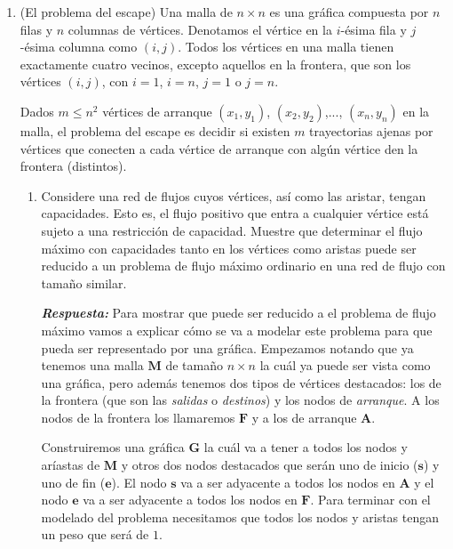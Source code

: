 \documentclass[11pt,letterpaper]{article}
\newcommand\respuesta{\textbf{\textit{Respuesta: }}}
\begin{document}
  \begin{enumerate}[leftmargin=*]
    \item (El problema del escape) Una malla de $n \times n$ es una gráfica compuesta por $n$ filas y $n$ columnas de vértices. Denotamos el vértice en la $i$-ésima fila y $j$-ésima columna como $(i,j)$. 
    Todos los vértices en una malla tienen exactamente cuatro vecinos, excepto aquellos en la frontera, que son los vértices $(i,j)$, con $i=1$, $i=n$, $j=1$ o $j=n$.
    
    Dados $m \leq n^2$ vértices de arranque $(x_1,y_1)$, $(x_2,y_2)$,..., $(x_n,y_n)$ en la malla, el problema del escape es decidir si existen $m$ trayectorias ajenas por vértices que conecten a cada vértice de arranque con algún vértice den la frontera (distintos).

    \begin{enumerate}[label=\alph*)]
      \item Considere una red de flujos cuyos vértices, así como las aristar, tengan capacidades.
      Esto es, el flujo positivo que entra a cualquier vértice está sujeto a una restricción de capacidad.
      Muestre que determinar el flujo máximo con capacidades tanto en los vértices como aristas puede ser reducido a un problema de flujo máximo ordinario en una red de flujo con tamaño similar.
    
      \respuesta Para mostrar que puede ser reducido a el problema de flujo máximo vamos a explicar cómo se va a modelar este problema para que pueda ser representado por una gráfica.
      Empezamos notando que ya tenemos una malla $\mathbf{M}$ de tamaño $n \times n$ la cuál ya puede ser vista como una gráfica, pero además tenemos dos tipos de vértices destacados: los de la frontera (que son las \textit{salidas} o \textit{destinos}) y los nodos de \textit{arranque}.
      A los nodos de la frontera los llamaremos $\mathbf{F}$ y a los de arranque $\mathbf{A}$.

      Construiremos una gráfica $\mathbf{G}$ la cuál va a tener a todos los nodos y aríastas de $\mathbf{M}$ y otros dos nodos destacados que serán uno de inicio ($\mathbf{s}$) y uno de fin ($\mathbf{e}$). 
      El nodo $\mathbf{s}$ va a ser adyacente a todos los nodos en $\mathbf{A}$ y el nodo $\mathbf{e}$ va a ser adyacente a todos los nodos en $\mathbf{F}$.
      Para terminar con el modelado del problema necesitamos que todos los nodos y aristas tengan un peso que será de $1$.


\end{enumerate}
\end{enumerate}
\end{document}
